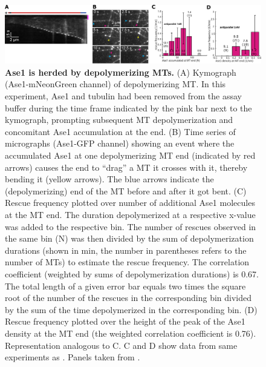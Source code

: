 \begin{figure}[h]
    \centering
    \includegraphics[width=1\linewidth]{Figures/ase2c.png}
    \caption[Ase1 is herded by depolymerizing MTs.]{\textbf{Ase1 is herded by depolymerizing MTs.}
    (A) Kymograph (Ase1-mNeonGreen channel) of depolymerizing MT. In this experiment, Ase1 and tubulin had been removed from the assay buffer during the time frame indicated by the pink bar next to the kymograph, prompting subsequent MT depolymerization and concomitant Ase1 accumulation at the end. (B) Time series of micrographs (Ase1-GFP channel) showing an event where the accumulated Ase1 at one depolymerizing MT end (indicated by red arrows) causes the end to “drag” a MT it crosses with it, thereby bending it (yellow arrows). The blue arrows indicate the (depolymerizing) end of the MT before and after it got bent. (C) Rescue frequency plotted over number of additional Ase1 molecules at the MT end. The duration depolymerized at a respective x-value was added to the respective bin. The number of rescues observed in the same bin (N) was then divided by the sum of depolymerization durations (shown in min, the number in parentheses refers to the number of MTs) to estimate the rescue frequency. The correlation coefficient (weighted \parencite{Pelletier2024} by sums of depolymerization durations) is 0.67. The total length of a given error bar equals two times the square root of the number of the rescues in the corresponding bin divided by the sum of the time depolymerized in the corresponding bin. (D) Rescue frequency plotted over the height of the peak of the Ase1 density at the MT end (the weighted correlation coefficient is 0.76). Representation analogous to C. C and D show data from same experiments as . Panels taken from \cite{Krattenmacher2024}.
        }\label{ase2c}
\end{figure}

